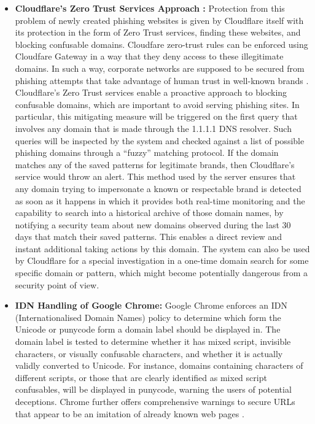 \begin{itemize}
    \item \textbf{Cloudflare's Zero Trust Services Approach :} Protection from this problem of newly created phishing websites is given by Cloudflare itself with its protection in the form of Zero Trust services, finding these websites, and blocking confusable domains. Cloudfare zero-trust rules can be enforced using Cloudfare Gateway in a way that they deny access to these illegitimate domains. In such a way, corporate networks are supposed to be secured from phishing attempts that take advantage of human trust in well-known brands \cite{Cloudflare2023}. Cloudflare's Zero Trust services enable a proactive approach to blocking confusable domains, which are important to avoid serving phishing sites. In particular, this mitigating measure will be triggered on the first query that involves any domain that is made through the 1.1.1.1 DNS resolver. Such queries will be inspected by the system and checked against a list of possible phishing domains through a “fuzzy” matching protocol. If the domain matches any of the saved patterns for legitimate brands, then Cloudflare's service would throw an alert. This method used by the server ensures that any domain trying to impersonate a known or respectable brand is detected as soon as it happens in which it provides both real-time monitoring and the capability to search into a historical archive of those domain names, by notifying a security team about new domains observed during the last 30 days that match their saved patterns. This enables a direct review and instant additional taking actions by this domain. The system can also be used by Cloudflare for a special investigation in a one-time domain search for some specific domain or pattern, which might become potentially dangerous from a security point of view.

     \item \textbf{IDN Handling of Google Chrome: } Google Chrome enforces an IDN (Internationalised Domain Names) policy to determine which form the Unicode or punycode form a domain label should be displayed in. The domain label is tested to determine whether it has mixed script, invisible characters, or visually confusable characters, and whether it is actually validly converted to Unicode. For instance, domains containing characters of different scripts, or those that are clearly identified as mixed script confusables, will be displayed in punycode, warning the users of potential deceptions. Chrome further offers comprehensive warnings to secure URLs that appear to be an imitation of already known web pages \cite{ChromiumIDN}.
     
\end{itemize}

